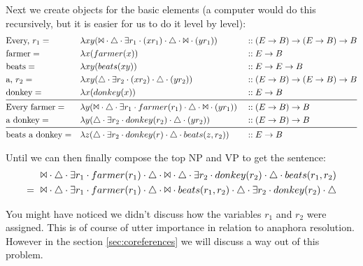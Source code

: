 \documentclass[12pt]{article}
\begin{document}
Next we create objects for the basic elements (a computer would do this recursively, but it is easier for us to do it level by level):
\begin{equation*}\begin{aligned}
&\text{Every, $r_1$}=&& \lambda xy(\Bowtie\cdot\triangle\cdot\exists r_1\cdot (xr_1)\cdot\triangle\cdot\Bowtie\cdot (yr_1)) &&:: (E\rightarrow B)\rightarrow(E\rightarrow B)\rightarrow B\\
&\text{farmer}=&& \lambda x(farmer(x)) &&:: E\rightarrow B\\
&\text{beats}=&& \lambda xy(beats(xy)) &&:: E\rightarrow E\rightarrow B\\
&\text{a, $r_2$}=&& \lambda xy(\triangle\cdot\exists r_2\cdot (xr_2)\cdot\triangle\cdot (yr_2)) &&:: (E\rightarrow B)\rightarrow(E\rightarrow B)\rightarrow B\\
&\text{donkey}=&& \lambda x(donkey(x)) &&:: E\rightarrow B\\
\midrule
&\text{Every farmer}=&& \lambda y(\Bowtie\cdot\triangle\cdot\exists r_1\cdot farmer(r_1)\cdot\triangle\cdot\Bowtie\cdot (yr_1)) &&:: (E\rightarrow B)\rightarrow B\\
&\text{a donkey}=&& \lambda y(\triangle\cdot\exists r_2\cdot donkey(r_2)\cdot\triangle\cdot (yr_2)) &&:: (E\rightarrow B)\rightarrow B\\
\midrule
&\text{beats a donkey}=&& \lambda z(\triangle\cdot\exists r_2\cdot donkey(r)\cdot\triangle\cdot beats(z,r_2)) &&:: E\rightarrow B\\
\end{aligned}\end{equation*}

Until we can then finally compose the top NP and VP to get the sentence:
\begin{equation*}\begin{aligned}
&\Bowtie\cdot\triangle\cdot\exists r_1\cdot farmer(r_1)\cdot\triangle\cdot\Bowtie\cdot \triangle\cdot\exists r_2\cdot donkey(r_2)\cdot\triangle\cdot beats(r_1,r_2)\\
=\text{ }&\Bowtie\cdot\triangle\cdot\exists r_1\cdot farmer(r_1)\cdot\triangle\cdot\Bowtie\cdot beats(r_1,r_2)\cdot \triangle\cdot\exists r_2\cdot donkey(r_2)\cdot\triangle
\end{aligned}\end{equation*}

You might have noticed we didn't discuss how the variables $r_1$ and $r_2$ were assigned. This is of course of utter importance in relation to anaphora resolution. However in the section \ref{sec:coreferences} we will discuss a way out of this problem.
\end{document}
